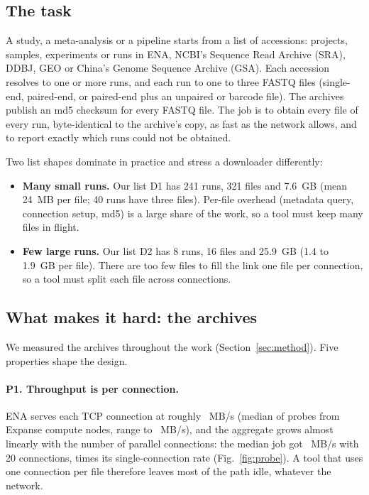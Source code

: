 \documentclass[11pt,a4paper]{article}
\newcommand{\figref}[1]{Fig.~\ref{#1}}
\newcommand{\secref}[1]{Section~\ref{#1}}
\begin{document}
\subsection{The task}
A study, a meta-analysis or a pipeline starts from a list of accessions: projects, samples, experiments or
runs in ENA, NCBI's Sequence Read Archive (SRA), DDBJ, GEO or China's Genome Sequence Archive (GSA). Each
accession resolves to one or more runs, and each run to one to three FASTQ files (single-end, paired-end,
or paired-end plus an unpaired or barcode file). The archives publish an md5 checksum for every FASTQ
file. The job is to obtain every file of every run, byte-identical to the archive's copy, as fast as the
network allows, and to report exactly which runs could not be obtained.

Two list shapes dominate in practice and stress a downloader differently:
\begin{itemize}
\item \textbf{Many small runs.} Our list D1 has 241 runs, 321 files and 7.6~GB (mean 24~MB per file; 40 runs
have three files). Per-file overhead (metadata query, connection setup, md5) is a large share of the work, so
a tool must keep many files in flight.
\item \textbf{Few large runs.} Our list D2 has 8 runs, 16 files and 25.9~GB (1.4 to 1.9~GB per file). There are
too few files to fill the link one file per connection, so a tool must split each file across connections.
\end{itemize}

\subsection{What makes it hard: the archives}
\label{sec:archives}
We measured the archives throughout the work (\secref{sec:method}). Five properties shape the design.

\paragraph{P1. Throughput is per connection.} ENA serves each TCP connection at roughly \probeOneMed{}~MB/s
(median of \probeN{} probes from Expanse compute nodes, range \probeOneMin{} to \probeOneMax{}~MB/s), and the
aggregate grows almost linearly with the number of parallel connections: the median job got \probeTwentyMed{}~MB/s
with 20 connections, \probeScaleMed{} times its single-connection rate (\figref{fig:probe}). A tool that uses one
connection per file therefore leaves most of the path idle, whatever the network.
\end{document}
